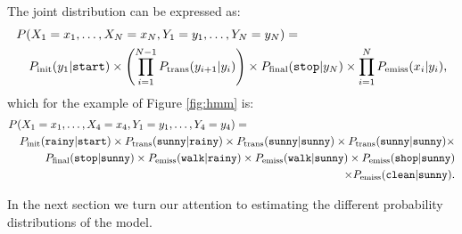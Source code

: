 The joint distribution can be expressed as:
\begin{eqnarray}\label{eqn:hmm}
\lefteqn{P(X_1=x_1,\ldots,X_N=x_N,Y_1=y_1,\ldots,Y_N=y_N)=}\nonumber\\
&&
P_{\mathrm{init}}(y_1|\text{\tt start}) 
\times
\left(
\prod_{i=1}^{N-1} P_{\mathrm{trans}}(y_{i+1}|y_i)
\right)
\times
P_{\mathrm{final}}(\text{\tt stop}|y_N)
\times 
\prod_{i=1}^{N} P_{\mathrm{emiss}}(x_i|y_i),
\end{eqnarray}
which for the example of Figure \ref{fig:hmm} is:
\begin{eqnarray}  \label{eqn:hmm_ex}
\lefteqn{P(X_1=x_1,\ldots,X_4=x_4,Y_1=y_1,\ldots,Y_4=y_4)=}\nonumber\\
&&
P_{\mathrm{init}}(\text{\tt rainy}|\text{\tt start}) 
\times
P_{\mathrm{trans}}(\text{\tt sunny}|\text{\tt rainy}) 
\times
P_{\mathrm{trans}}(\text{\tt sunny}|\text{\tt sunny}) 
\times
P_{\mathrm{trans}}(\text{\tt sunny}|\text{\tt sunny}) 
\times\nonumber\\&&
P_{\mathrm{final}}(\text{\tt stop}|\text{\tt sunny}) 
\times
P_{\mathrm{emiss}}(\text{\tt walk}|\text{\tt rainy}) 
\times
P_{\mathrm{emiss}}(\text{\tt walk}|\text{\tt sunny}) 
\times
P_{\mathrm{emiss}}(\text{\tt shop}|\text{\tt sunny}) \nonumber\\&&
\times
P_{\mathrm{emiss}}(\text{\tt clean}|\text{\tt sunny}).
\end{eqnarray}

In the next section we turn our attention to estimating the different
probability distributions of the model.
